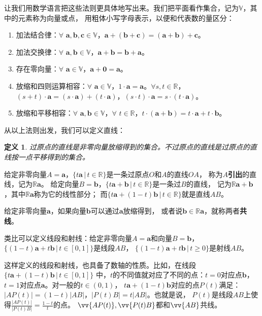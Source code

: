 \documentclass[12pt,UTF8]{ctexbook}
\newtheorem{df}{定义}[section]
\begin{document}
让我们用数学语言把这些法则更具体地写出来。我们把平面看作集合，记为$\mathbb{V}$，其中的元素称为向量或点，
用粗体小写字母表示，以便和代表数的量区分：
\begin{enumerate}
    \item 加法结合律：$\forall \,\, \mathbf{a}, \mathbf{b}, \mathbf{c} \in \mathbb{V}$，$\mathbf{a}+ (\mathbf{b} + \mathbf{c}) = (\mathbf{a} + \mathbf{b}) + \mathbf{c}$。
    \item 加法交换律：$\forall \,\, \mathbf{a}, \mathbf{b} \in \mathbb{V}$，$\mathbf{a} + \mathbf{b} = \mathbf{b} + \mathbf{a}$。
    \item 存在零向量：$\forall \,\, \mathbf{a} \in \mathbb{V}$，$\mathbf{a} + \mathbf{0} = \mathbf{a}$。
    \item 放缩和四则运算相容：$\forall \,\, \mathbf{a} \in \mathbb{V}$，$1\cdot \mathbf{a} = \mathbf{a}$。$\forall s, t \in \mathbb{R}$，$(s + t)\cdot\mathbf{a} = (s\cdot\mathbf{a}) + (t\cdot\mathbf{a})$，$(s \cdot t)\cdot \mathbf{a} = s \cdot (t\cdot \mathbf{a})$。
    \item 放缩和平移相容：$\forall \,\, \mathbf{a}, \mathbf{b} \in \mathbb{V}$，$\forall \,\, t \in \mathbb{R}$，$t\cdot(\mathbf{a} + \mathbf{b}) = t\cdot\mathbf{a} + t\cdot\mathbf{b}$。
\end{enumerate}

从以上法则出发，我们可以定义直线：
\begin{df}
    过原点的直线是非零向量放缩得到的集合。不过原点的直线是过原点的直线按一点平移得到的集合。
\end{df}
给定非零向量$A = \mathbf{a}$，$ \{t\mathbf{a} \, | \, t\in\mathbb{R}\}$是一条过原点$O$和$A$的直线$OA$，
称为$A$\textbf{引出}的直线，记为$\mathbb{R}\mathbf{a}$。
给定向量$B = \mathbf{b}$，$ \{t\mathbf{a}+\mathbf{b} \, | \, t\in\mathbb{R}\}$是一条过$B$的直线，
记为$\mathbb{R}\mathbf{a}+\mathbf{b}$，其中$\mathbb{R}\mathbf{a}$称为它的线性部分；
而$ \{t\mathbf{a}+(1 - t)\mathbf{b} \, | \, t\in\mathbb{R}\}$就是直线$AB$。

给定非零向量$\mathbf{a}$，如果向量$\mathbf{b}$可以通过$\mathbf{a}$放缩得到，
或者说$\mathbf{b}\in \mathbb{R}\mathbf{a}$，就称两者\textbf{共线}。

类比可以定义线段和射线：给定非零向量$A = \mathbf{a}$和向量$B =\mathbf{b}$，
$ \{(1 - t)\mathbf{a}+t\mathbf{b} \, | \, t\in [0, 1]\}$是线段$AB$，
$ \{(1 - t)\mathbf{a}+t\mathbf{b} \, | \, t \geqslant 0 \}$是射线$AB$。

这样定义的线段和射线，也具备了数轴的性质。比如，在线段$\{t\mathbf{a}+(1 - t)\mathbf{b} \, | \, t\in [0, 1]\}$
中，$t$的不同值就对应了不同的点：$t = 0$对应点$\mathbf{b}$，$t=1$对应点$\mathbf{a}$。对一般的$t\in (0, 1)$，
$t\mathbf{a}+(1 - t)\mathbf{b}$对应的点$P(t)$满足：$|AP(t)| = (1 - t)|AB|$，$|P(t)B| = t|AB|$。也就是说，
$P(t)$是线段$AB$上使得$ \frac{|AP(t)|}{|P(t)B|} = \frac{1 - t}{t}$的点。
$\vv{AP(t)}, \vv{P(t)B}$都和$\vv{AB}$共线。
\end{document}
